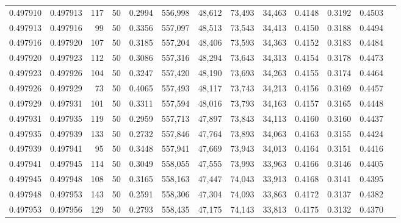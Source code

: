 \begin{tabular}{rrrrrrrrrrrrr}
0.497910 & 0.497913 &   117 &  50 &                                     0.2994 & 556,998 &  48,612 &  73,493 &  34,463 & 0.4148 & 0.3192 & 0.4503 \\
0.497913 & 0.497916 &    99 &  50 &                                     0.3356 & 557,097 &  48,513 &  73,543 &  34,413 & 0.4150 & 0.3188 & 0.4494 \\
0.497916 & 0.497920 &   107 &  50 &                                     0.3185 & 557,204 &  48,406 &  73,593 &  34,363 & 0.4152 & 0.3183 & 0.4484 \\
0.497920 & 0.497923 &   112 &  50 &                                     0.3086 & 557,316 &  48,294 &  73,643 &  34,313 & 0.4154 & 0.3178 & 0.4473 \\
0.497923 & 0.497926 &   104 &  50 &                                     0.3247 & 557,420 &  48,190 &  73,693 &  34,263 & 0.4155 & 0.3174 & 0.4464 \\
0.497926 & 0.497929 &    73 &  50 &                                     0.4065 & 557,493 &  48,117 &  73,743 &  34,213 & 0.4156 & 0.3169 & 0.4457 \\
0.497929 & 0.497931 &   101 &  50 &                                     0.3311 & 557,594 &  48,016 &  73,793 &  34,163 & 0.4157 & 0.3165 & 0.4448 \\
0.497931 & 0.497935 &   119 &  50 &                                     0.2959 & 557,713 &  47,897 &  73,843 &  34,113 & 0.4160 & 0.3160 & 0.4437 \\
0.497935 & 0.497939 &   133 &  50 &                                     0.2732 & 557,846 &  47,764 &  73,893 &  34,063 & 0.4163 & 0.3155 & 0.4424 \\
0.497939 & 0.497941 &    95 &  50 &                                     0.3448 & 557,941 &  47,669 &  73,943 &  34,013 & 0.4164 & 0.3151 & 0.4416 \\
0.497941 & 0.497945 &   114 &  50 &                                     0.3049 & 558,055 &  47,555 &  73,993 &  33,963 & 0.4166 & 0.3146 & 0.4405 \\
0.497945 & 0.497948 &   108 &  50 &                                     0.3165 & 558,163 &  47,447 &  74,043 &  33,913 & 0.4168 & 0.3141 & 0.4395 \\
0.497948 & 0.497953 &   143 &  50 &                                     0.2591 & 558,306 &  47,304 &  74,093 &  33,863 & 0.4172 & 0.3137 & 0.4382 \\
0.497953 & 0.497956 &   129 &  50 &                                     0.2793 & 558,435 &  47,175 &  74,143 &  33,813 & 0.4175 & 0.3132 & 0.4370 \\

\end{tabular}
